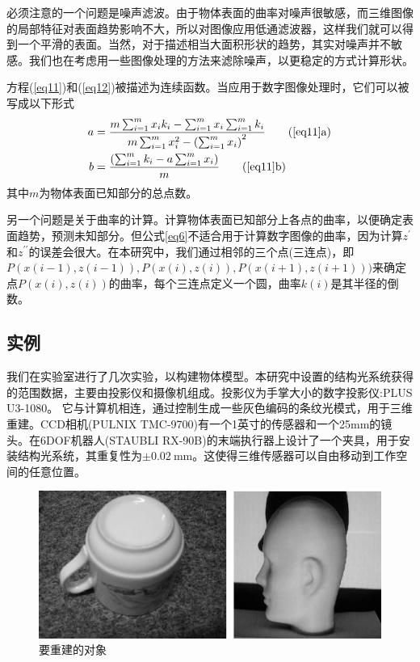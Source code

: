 \documentclass[AutoFakeBold,zihao=-4]{ctexart}
\begin{document}
	必须注意的一个问题是噪声滤波。由于物体表面的曲率对噪声很敏感，而三维图像的局部特征对表面趋势影响不大，所以对图像应用低通滤波器，这样我们就可以得到一个平滑的表面。当然，对于描述相当大面积形状的趋势，其实对噪声并不敏感。我们也在考虑用一些图像处理的方法来滤除噪声，以更稳定的方式计算形状。
	
	方程(\ref{eq11})和(\ref{eq12})被描述为连续函数。当应用于数字图像处理时，它们可以被写成以下形式
	\begin{subequations}
		\begin{align}
			a &=\frac{m \sum_{i=1}^{m} x_{i} k_{i}-\sum_{i=1}^{m} x_{i} \sum_{i=1}^{m} k_{i}}{m \sum_{i=1}^{m} x_{i}^{2}-\left(\sum_{i=1}^{m} x_{i}\right)^{2}} \tag{\ref{eq11}{a}} \label{eq11a}\\
			b &=\frac{\left(\sum_{i=1}^{m} k_{i}-a \sum_{i=1}^{m} x_{i}\right)}{m} \tag{\ref{eq11}{b}} \label{eq11b}
		\end{align}
	\end{subequations}
	其中$ m $为物体表面已知部分的总点数。
	
	另一个问题是关于曲率的计算。计算物体表面已知部分上各点的曲率，以便确定表面趋势，预测未知部分。但公式\eqref{eq6}不适合用于计算数字图像的曲率，因为计算$ z^{\prime} $和$ z^{\prime \prime} $的误差会很大。在本研究中，我们通过相邻的三个点(三连点)，即$ P(x(i-1),z(i-1)), P(x(i),z(i)), P(x(i+1),z(i+1))) $来确定点$ P(x(i),z(i)) $的曲率，每个三连点定义一个圆，曲率$ k(i) $是其半径的倒数。
	
	\subsection{实例}
	
	我们在实验室进行了几次实验，以构建物体模型。本研究中设置的结构光系统获得的范围数据，主要由投影仪和摄像机组成。投影仪为手掌大小的数字投影仪:PLUS U3-1080。 它与计算机相连，通过控制生成一些灰色编码的条纹光模式，用于三维重建\cite{li2003automatic}。CCD相机(PULNIX TMC-9700)有一个1英寸的传感器和一个25mm的镜头。在6DOF机器人(STAUBLI RX-90B)的末端执行器上设计了一个夹具，用于安装结构光系统，其重复性为$ \pm 0.02 \mathrm{~mm} $。这使得三维传感器可以自由移动到工作空间的任意位置。
	\begin{figure}[h]
		\centering
		\includegraphics[scale=0.35]{PIC6}
		\caption{要重建的对象}
		\label{fig-Objects}
	\end{figure}
\end{document}
